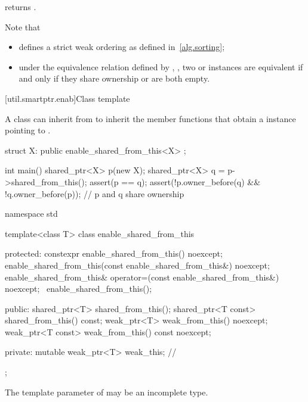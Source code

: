 %
\pnum
{} returns .
\begin{note}
Note that
\begin{itemize}
\item {} defines a strict weak ordering as defined in~\ref{alg.sorting};

\item under the equivalence relation defined by ,
, two  or
 instances are equivalent if and only if they share ownership or are
both empty.
\end{itemize}
\end{note}

[util.smartptr.enab]{Class template }

\pnum
{}%
A class  can inherit from 
to inherit the  member functions that obtain
a  instance pointing to .

\pnum
\begin{example}
\begin{codeblock}
struct X: public enable_shared_from_this<X> { };

int main() {
  shared_ptr<X> p(new X);
  shared_ptr<X> q = p->shared_from_this();
  assert(p == q);
  assert(!p.owner_before(q) && !q.owner_before(p)); // p and q share ownership
}
\end{codeblock}
\end{example}

\begin{codeblock}
namespace std {
  template<class T> class enable_shared_from_this {
  protected:
    constexpr enable_shared_from_this() noexcept;
    enable_shared_from_this(const enable_shared_from_this&) noexcept;
    enable_shared_from_this& operator=(const enable_shared_from_this&) noexcept;
    ~enable_shared_from_this();

  public:
    shared_ptr<T> shared_from_this();
    shared_ptr<T const> shared_from_this() const;
    weak_ptr<T> weak_from_this() noexcept;
    weak_ptr<T const> weak_from_this() const noexcept;

  private:
    mutable weak_ptr<T> weak_this;  // \expos
  };
}
\end{codeblock}

\pnum
The template parameter  of 
may be an incomplete type.

